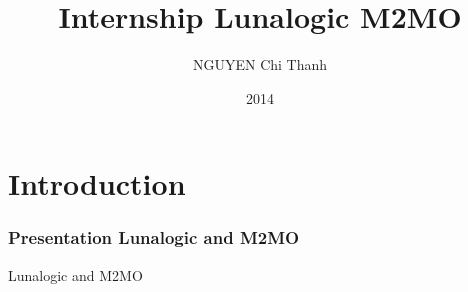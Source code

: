 \documentclass[]{beamer}
\title[Off-Cycle internship]{Internship Lunalogic M2MO}
\author[Chi Thanh NGUYEN]{NGUYEN Chi Thanh}
\institute[Lunalogic - M2MO]{Lunalogic and M2MO}
\date{2014}
\begin{document}
\begin{frame}[plain]
\titlepage
\end{frame}

\begin{frame}
\tableofcontents
\end{frame}

\section{Introduction}
\begin{frame}
\frametitle{Presentation Lunalogic and M2MO}
Lunalogic and M2MO
\end{frame}
\end{document}
